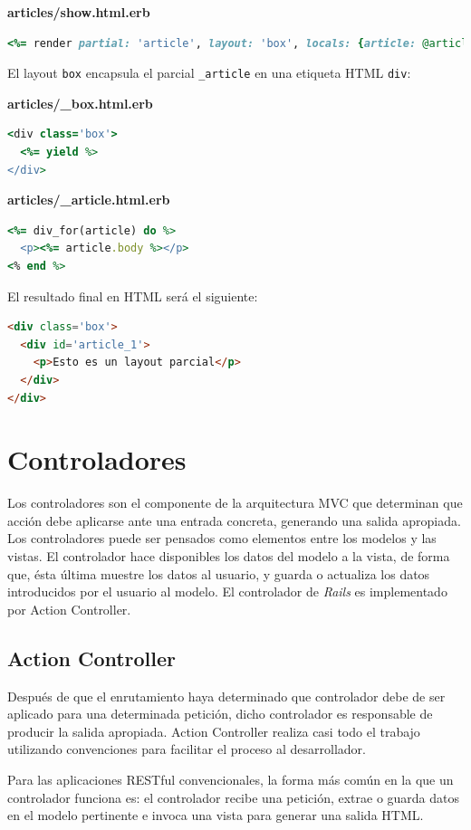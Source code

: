 \textbf{articles/show.html.erb}
\begin{lstlisting}[language=Ruby]
<%= render partial: 'article', layout: 'box', locals: {article: @article} %>
\end{lstlisting}

El layout \texttt{box} encapsula el parcial \texttt{\_article} en una etiqueta HTML \texttt{div}:

\textbf{articles/\_box.html.erb}
\begin{lstlisting}[language=Ruby]
<div class='box'>
  <%= yield %>
</div>
\end{lstlisting}

\textbf{articles/\_article.html.erb}
\begin{lstlisting}[language=Ruby]
<%= div_for(article) do %>
  <p><%= article.body %></p>
<% end %>
\end{lstlisting}

El resultado final en HTML será el siguiente:

\begin{lstlisting}[language=HTML]
<div class='box'>
  <div id='article_1'>
    <p>Esto es un layout parcial</p>
  </div>
</div>
\end{lstlisting}


\section{Controladores}
Los controladores son el componente de la arquitectura MVC que determinan que acción debe aplicarse ante una entrada concreta, generando una salida apropiada. Los controladores puede ser pensados como elementos entre los modelos y las vistas. El controlador hace disponibles los datos del modelo a la vista, de forma que, ésta última muestre los datos al usuario, y guarda o actualiza los datos introducidos por el usuario al modelo.
El controlador de \textit{Rails} es implementado por Action Controller.


\subsection{Action Controller}
Después de que el enrutamiento haya determinado que controlador debe de ser aplicado para una determinada petición, dicho controlador es responsable de producir la salida apropiada. Action Controller realiza casi todo el trabajo utilizando convenciones para facilitar el proceso al desarrollador.

Para las aplicaciones RESTful convencionales, la forma más común en la que un controlador funciona es: el controlador recibe una petición, extrae o guarda datos en el modelo pertinente e invoca una vista para generar una salida HTML.

